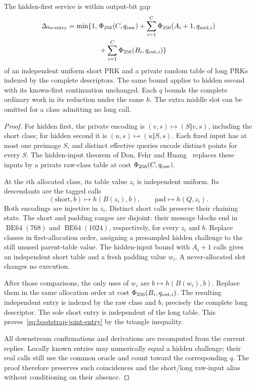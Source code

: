 \begin{theorem}
\label{thm:bootstrap-joint-entry}
The hidden-first service is within output-bit gap
\begin{equation}
 \begin{split}
 \Delta_{\rm bs\text{-}entry}=\min\{1,\;&\Phi_{256}(C,q_{\rm raw})
  +\sum_{i=1}^{C}\Phi_{256}(A_i+1,q_{{\rm mid},i})\\
  &+\sum_{i=1}^{C}\Phi_{256}(B_i,q_{{\rm out},i})\}
 \end{split}
 \label{eq:bootstrap-joint-entry}
\end{equation}
of an independent uniform short PRK and a private random table of long
PRKs indexed by the complete descriptors. The same bound applies to
hidden second with its known-first continuation unchanged. Each $q$
bounds the complete ordinary work in its reduction under the same $h$.
The extra middle slot can be omitted for a class admitting no long call.
\end{theorem}
\begin{proof}
For hidden first, the private encoding is
$(v,s)\mapsto(S\Vert v,s)$, including the short class; for hidden
second it is $(u,s)\mapsto(u\Vert S,s)$. Each fixed input has at most
one preimage $S$, and distinct effective queries encode distinct points
for every $S$. The hidden-input theorem of Don, Fehr and
Huang~\cite[Theorem~2]{dfh2022} replaces these inputs by a private
raw-class table at cost $\Phi_{256}(C,q_{\rm raw})$.

At the $i$th allocated class, its table value $z_i$ is independent uniform.
Its descendants are the tagged calls
\[
 (\mathrm{short},b)\longmapsto h(B(z_i),b),\qquad
 \mathrm{pad}\longmapsto h(Q,z_i).
\]
Both encodings are injective in $z_i$. Distinct short calls preserve
their chaining state. The short and padding ranges are disjoint: their
message blocks end in $\operatorname{BE64}(768)$ and
$\operatorname{BE64}(1024)$, respectively, for every $z_i$ and $b$.
Replace classes in first-allocation order, assigning a presampled hidden
challenge to the still unused parent-table value. The hidden-input
bound with $A_i+1$ calls gives an independent short table and a fresh
padding value $w_i$. A never-allocated slot changes no execution.

After those comparisons, the only uses of $w_i$ are
$b\mapsto h(B(w_i),b)$. Replace them in the same allocation order
at cost $\Phi_{256}(B_i,q_{{\rm out},i})$. The resulting independent
entry is indexed by the raw class and $b$, precisely the complete long
descriptor. The sole short entry is independent of the long table.
This proves~\eqref{eq:bootstrap-joint-entry} by the triangle inequality.

All downstream confirmations and derivations are recomputed from the
current replies. Locally known entries may numerically equal a hidden
challenge; their real calls still use the common oracle and count toward
the corresponding $q$. The proof therefore preserves such coincidences
and the short/long raw-input alias without conditioning on their absence.
\end{proof}


